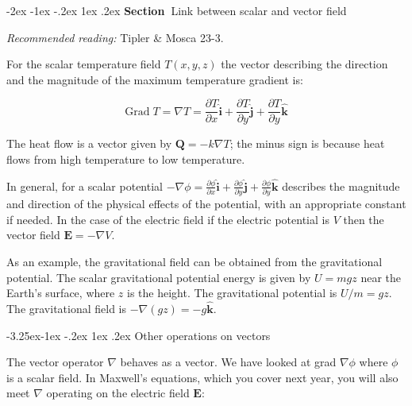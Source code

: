 \documentclass[
]{book}
\makeatletter
\renewcommand\section{%
\@startsection{section}{1}{\z@}%
              {-2ex \@plus -1ex \@minus -.2ex}%
              {1ex \@plus .2ex}%
              {\sffamily\bfseries\large\noindent Section~}}
\renewcommand\subsection{%
\@startsection{subsection}{2}{\z@}%
              {-3.25ex\@plus -1ex \@minus -.2ex}%
              {1ex \@plus .2ex}%
              {\sffamily\bfseries}}
\numberwithin{equation}{section}
\makeatother
\begin{document}
\hypertarget{link-between-scalar-and-vector-field}{%
\section{Link between scalar and vector field}\label{link-between-scalar-and-vector-field}}

\emph{Recommended reading:} Tipler \& Mosca 23-3.

For the scalar temperature field \(T(x,y,z)\) the vector describing the
direction and the magnitude of the maximum temperature gradient is:

\begin{equation}
\label{eq:tempGrad}
 \text{Grad} \; T = \nabla T = \frac{\partial T} {\partial x} \hat{\mathbf{i}} + \frac{\partial T}{\partial y} \hat{\mathbf{j}} + \frac{\partial T}{\partial y} \hat{\mathbf{k}}
\end{equation}

The heat flow is a vector given by \(\mathbf{Q} = -k \nabla T\); the minus sign is
because heat flows from high temperature to low temperature.

In general, for a scalar potential
\(-\nabla \phi = \frac{\partial \phi} {\partial x} \hat{\mathbf{i}} + \frac{\partial \phi}{\partial y} \hat{\mathbf{j}} + \frac{\partial \phi}{\partial y} \hat{\mathbf{k}}\)
describes the magnitude and direction of the physical effects of the
potential, with an appropriate constant if needed. In the case of the
electric field if the electric potential is \(V\) then the vector field
\(\mathbf{E} = -\nabla V\).

As an example, the gravitational field can be obtained from the
gravitational potential. The scalar gravitational potential energy is
given by \(U = mgz\) near the Earth's surface, where \(z\) is the height.
The gravitational potential is \(U/m = gz\). The gravitational field is
\(-\nabla(gz)=-g \hat{\mathbf{k}}\).

\hypertarget{other-operations-on-vectors}{%
\subsection{Other operations on vectors}\label{other-operations-on-vectors}}

The vector operator \(\nabla\) behaves as a vector. We have looked at grad
\(\nabla\phi\) where \(\phi\) is a scalar field. In Maxwell's equations,
which you cover next year, you will also meet \(\nabla\) operating on the
electric field \(\mathbf{E}\):
\end{document}
